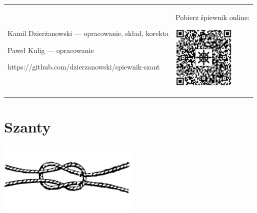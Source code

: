 \documentclass[11pt, twoside]{book}
\begin{document}
\tableofcontents
\vfill
\renewcommand{\tabularxcolumn}[1]{>{\small}b{#1}}
\begin{adjustbox}{width={\textwidth}, keepaspectratio}  %
\begin{tabularx}{\textwidth}{%
        @{}
        >{\raggedright\arraybackslash}X
        @{}
        >{\raggedleft\arraybackslash}X
    }
    \footnotesize
    Kamil Dzierżanowski --- opracowanie, skład, korekta

    Paweł Kulig --- opracowanie

    \medskip

    https://github.com/dzierzanowski/spiewnik-szant

    &

    Pobierz śpiewnik online:

    \includegraphics[width=3cm]{images/qr.png}
\end{tabularx}
\end{adjustbox}

\chapter{Szanty}
\begin{center}
    \includegraphics[width=0.5\textwidth]{images/wezel.png}
\end{center}
\pagestyle{szanty}
\setcounter{section}{2}

\setcounter{section}{4}

\setcounter{section}{5}  %

\setcounter{section}{7}
\newpage\pagestyle{szanty}
\setcounter{section}{11}

\setcounter{section}{17}
\newpage\pagestyle{szanty}
\setcounter{section}{20}

\setcounter{section}{23}

\setcounter{section}{29}

\end{document}
